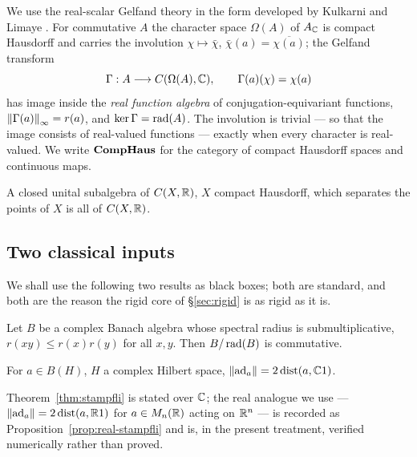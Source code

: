 We use the real-scalar Gelfand theory in the form developed by Kulkarni and
Limaye \cite{KulkarniLimaye}.  For commutative $A$ the character space
$\Omega(A)$ of $A_{\mathbb{C}}$ is compact Hausdorff and carries the involution
$\chi\mapsto\bar\chi$, $\bar\chi(a)=\overline{\chi(a)}$; the Gelfand transform
\[
  \Gamma:A\longrightarrow C(\Omega(A),\mathbb{C}),\qquad \Gamma(a)(\chi)=\chi(a)
\]
has image inside the \emph{real function algebra} of conjugation-equivariant
functions, $\left\lVert\Gamma(a)\right\rVert_\infty=r(a)$, and $\ker\Gamma=\operatorname{rad}(A)$.  The
involution is trivial --- so that the image consists of real-valued functions
--- exactly when every character is real-valued.  We write $\mathbf{CompHaus}$ for the
category of compact Hausdorff spaces and continuous maps.

\begin{theorem}\label{thm:stone-weierstrass}
A closed unital subalgebra of $C(X,\mathbb{R})$, $X$ compact Hausdorff, which separates
the points of $X$ is all of $C(X,\mathbb{R})$.
\end{theorem}

\subsection{Two classical inputs}

We shall use the following two results as black boxes; both are standard, and
both are the reason the rigid core of \S\ref{sec:rigid} is as rigid as it is.

\begin{theorem}
\label{thm:hz}
Let $B$ be a complex Banach algebra whose spectral radius is submultiplicative,
$r(xy)\le r(x)r(y)$ for all $x,y$.  Then $B/\operatorname{rad}(B)$ is commutative.
\end{theorem}

\begin{theorem}\label{thm:stampfli}
For $a\in B(H)$, $H$ a complex Hilbert space,
$\left\lVert\operatorname{ad}_a\right\rVert=2\operatorname{dist}(a,\mathbb{C}1)$.
\end{theorem}

Theorem~\ref{thm:stampfli} is stated over $\mathbb{C}$; the real analogue we use ---
$\left\lVert\operatorname{ad}_a\right\rVert=2\operatorname{dist}(a,\mathbb{R}1)$ for $a\in M_n(\mathbb{R})$ acting on $\mathbb{R}^n$ --- is
recorded as Proposition~\ref{prop:real-stampfli} and is, in the present
treatment, verified numerically rather than proved.
